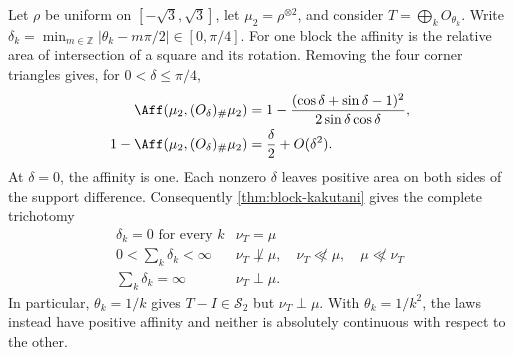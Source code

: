 Let \(\rho\) be uniform on \([-\sqrt3,\sqrt3]\), let
\(\mu_2=\rho^{\otimes2}\), and consider \(T=\bigoplus_kO_{\theta_k}\).
Write
\(\delta_k=\min_{m\in\mathbb Z}|\theta_k-m\pi/2|\in[0,\pi/4]\).
For one block the affinity is the relative area of intersection
of a square and its rotation.
Removing the four corner triangles gives, for \(0<\delta\leq\pi/4\),
\begin{equation}
 \begin{aligned}
 \Aff(\mu_2,(O_\delta)_\#\mu_2)
 &=1-\frac{(\cos\delta+\sin\delta-1)^2}
                {2\sin\delta\cos\delta},\\
 1-\Aff(\mu_2,(O_\delta)_\#\mu_2)
 &=\frac{\delta}{2}+O(\delta^2).
 \end{aligned}
 \label{eq:uniform-square-rotation-affinity}
\end{equation}
At \(\delta=0\), the affinity is one.  Each nonzero \(\delta\) leaves
positive area on both sides of the support difference.
Consequently \cref{thm:block-kakutani} gives the complete trichotomy
\begin{equation}
 \begin{array}{c|l}
  \delta_k=0\text{ for every }k&\nu_T=\mu\\
  0<\sum_k\delta_k<\infty&
      \nu_T\not\perp\mu,\quad \nu_T\not\ll\mu,\quad\mu\not\ll\nu_T\\
  \sum_k\delta_k=\infty&\nu_T\perp\mu.
 \end{array}
 \label{eq:uniform-square-block-trichotomy}
\end{equation}
In particular, \(\theta_k=1/k\) gives \(T-I\in\mathcal S_2\) but
\(\nu_T\perp\mu\).
With \(\theta_k=1/k^2\), the laws instead have positive affinity
and neither is absolutely continuous with respect to the other.

